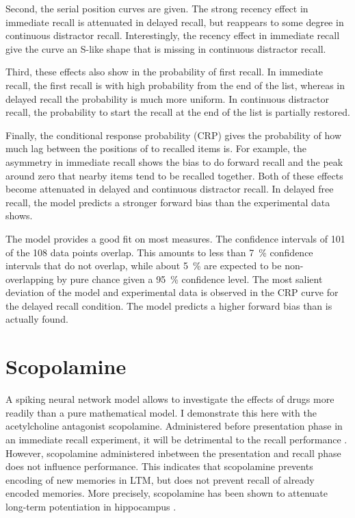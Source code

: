 Second, the serial position curves are given.
The strong recency effect in immediate recall is attenuated in delayed recall, but reappears to some degree in continuous distractor recall.
Interestingly, the recency effect in immediate recall give the curve an S-like shape that is missing in continuous distractor recall.

Third, these effects also show in the probability of first recall.
In immediate recall, the first recall is with high probability from the end of the list, whereas in delayed recall the probability is much more uniform.
In continuous distractor recall, the probability to start the recall at the end of the list is partially restored.

Finally, the conditional response probability (CRP) gives the probability of how much lag between the positions of to recalled items is.
For example, the asymmetry in immediate recall shows the bias to do forward recall and the peak around zero that nearby items tend to be recalled together.
Both of these effects become attenuated in delayed and continuous distractor recall.
In delayed free recall, the model predicts a stronger forward bias than the experimental data shows.

The model provides a good fit on most measures.
The confidence intervals of \num{101} of the \num{108} data points overlap.
This amounts to less than \SI{7}{\percent} confidence intervals that do not overlap, while about \SI{5}{\percent} are expected to be non-overlapping by pure chance given a \SI{95}{\percent} confidence level.
The most salient deviation of the model and experimental data is observed in the CRP curve for the delayed recall condition.
The model predicts a higher forward bias than is actually found.


\section{Scopolamine}
A spiking neural network model allows to investigate the effects of drugs more readily than a pure mathematical model.
I demonstrate this here with the acetylcholine antagonist scopolamine.
Administered before presentation phase in an immediate recall experiment, it will be detrimental to the recall performance \parencite{ghoneim1975}.
However, scopolamine administered inbetween the presentation and recall phase does not influence performance.
This indicates that scopolamine prevents encoding of new memories in LTM, but does not prevent recall of already encoded memories.
More precisely, scopolamine has been shown to attenuate long-term potentiation in hippocampus \parencite{leung2003,ito1988,hirotsu1989-1}.

